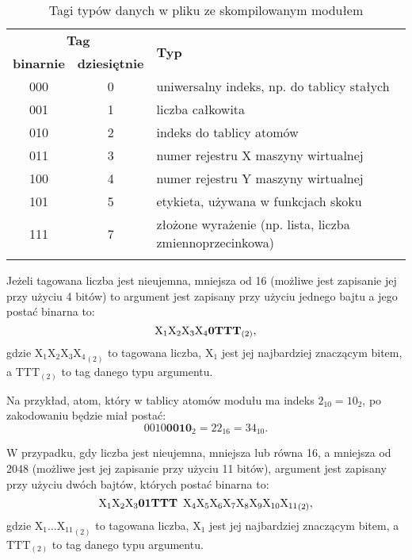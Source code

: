 \begin{longtable}{|c|c|p{9cm}|}
\hline

\multicolumn{2}{|c|}{\textbf{Tag}} & \multirow{2}{*}{\textbf{Typ}} \\
\cline{1-2}
\textbf{binarnie} & \textbf{dziesiętnie} & \\
\hline
\endfirsthead

000 & 0 & uniwersalny indeks, np. do tablicy stałych \\
\hline
001 & 1 & liczba całkowita \\ 
\hline
010 & 2 & indeks do tablicy atomów \\
\hline
011 & 3 & numer rejestru X maszyny wirtualnej \\
\hline
100 & 4 & numer rejestru Y maszyny wirtualnej \\
\hline
101 & 5 & etykieta, używana w funkcjach skoku \\
\hline
111 & 7 & złożone wyrażenie (np. lista, liczba zmiennoprzecinkowa) \\
\hline

\caption{Tagi typów danych w pliku ze skompilowanym modułem} 
\label{table:codeTags} \\
\end{longtable}

Jeżeli tagowana liczba jest nieujemna, mniejsza od 16 (możliwe jest zapisanie jej przy użyciu 4 bitów) to argument jest zapisany przy użyciu jednego bajtu a jego postać binarna to:
$$ \text{X}_1\text{X}_2\text{X}_3\text{X}_4\mathbf{0}\text{\textbf{TTT}}_{(2)}, $$
gdzie ${\text{X}_1\text{X}_2\text{X}_3\text{X}_4}_{(2)}$ to tagowana liczba, $\text{X}_1$ jest jej najbardziej znaczącym bitem, a $\text{TTT}_{(2)}$ to tag danego typu argumentu.

Na przykład, atom, który w tablicy atomów modułu ma indeks $2_{10} = 10_{2}$, po zakodowaniu będzie miał postać:
$$0010\mathbf{0010}_{2} = 22_{16} = 34_{10}.$$

W przypadku, gdy liczba jest nieujemna, mniejsza lub równa 16, a mniejsza od 2048 (możliwe jest jej zapisanie przy użyciu 11 bitów), argument jest zapisany przy użyciu dwóch bajtów, których postać binarna to:
$$  {\text{X}_1\text{X}_2\text{X}_3\mathbf{01}\text{\textbf{TTT}} \enskip \text{X}_4\text{X}_5\text{X}_6\text{X}_7\text{X}_8\text{X}_9\text{X}_{10}\text{X}_{11}}_{(2)}, $$
gdzie ${\text{X}_1 ... \text{X}_{11}}_{(2)}$ to tagowana liczba, $\text{X}_1$ jest jej najbardziej znaczącym bitem, a ${\text{TTT}}_{(2)}$ to tag danego typu argumentu.

